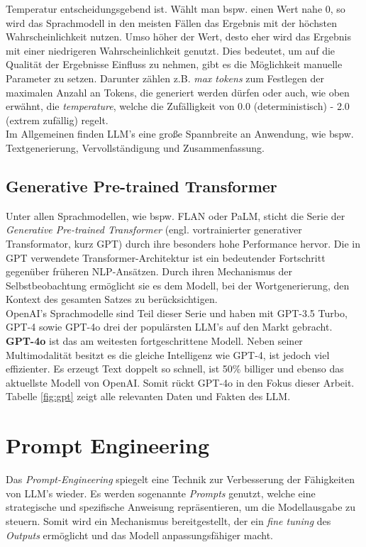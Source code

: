 Temperatur entscheidungsgebend ist. Wählt man bspw. einen Wert nahe 0, so wird das Sprachmodell in den meisten Fällen das Ergebnis mit der höchsten Wahrscheinlichkeit nutzen. Umso höher der Wert, desto eher wird das Ergebnis mit einer niedrigeren Wahrscheinlichkeit genutzt. \cite*{WeightsBiases} Dies bedeutet, um auf die Qualität der Ergebnisse Einfluss zu nehmen, gibt es die Möglichkeit manuelle Parameter zu setzen. Darunter zählen z.B. \textit{max tokens} zum Festlegen der maximalen Anzahl an Tokens, die generiert werden dürfen oder auch, wie oben erwähnt, die \textit{temperature}, welche die Zufälligkeit von 0.0 (deterministisch) - 2.0 (extrem zufällig) regelt.\\ Im Allgemeinen finden LLM's eine große Spannbreite an Anwendung, wie bspw. Textgenerierung, Vervollständigung und Zusammenfassung. \cite*{dhadukHowLargeLanguage2023}

\subsection{Generative Pre-trained Transformer}
Unter allen Sprachmodellen, wie bspw. FLAN oder PaLM, sticht die Serie der \textit{Generative Pre-trained Transformer} (engl. vortrainierter generativer Transformator, kurz GPT) durch ihre besonders hohe Performance hervor. \cite*{yeComprehensiveCapabilityAnalysis2023} Die in GPT verwendete Transformer-Architektur ist ein bedeutender Fortschritt gegenüber früheren \acs{NLP}-Ansätzen. Durch ihren Mechanismus der Selbstbeobachtung ermöglicht sie es dem Modell, bei der Wortgenerierung, den Kontext des gesamten Satzes zu berücksichtigen. \cite*{yenduriGenerativePretrainedTransformer2023} \\ OpenAI's Sprachmodelle sind Teil dieser Serie und haben mit GPT-3.5 Turbo, GPT-4 sowie GPT-4o drei der populärsten LLM's auf den Markt gebracht. \cite*{yaoSurveyLargeLanguage2024}\\
\textbf{GPT-4o} ist das am weitesten fortgeschrittene Modell. Neben seiner Multimodalität besitzt es die gleiche Intelligenz wie GPT-4, ist jedoch viel effizienter. Es erzeugt Text doppelt so schnell, ist 50\% billiger und ebenso das aktuellste Modell von OpenAI. Somit rückt GPT-4o in den Fokus dieser Arbeit. \cite*{OpenAIPlatform} Tabelle \ref{fig:gpt} zeigt alle relevanten Daten und Fakten des LLM.



\section{Prompt Engineering}
Das \textit{Prompt-Engineering} spiegelt eine Technik zur Verbesserung der Fähigkeiten von LLM's wieder. Es werden sogenannte \textit{Prompts} genutzt, welche eine strategische und spezifische Anweisung repräsentieren, um die Modellausgabe zu steuern. Somit wird ein Mechanismus bereitgestellt, der ein \textit{fine tuning} des \textit{Outputs} ermöglicht und das Modell anpassungsfähiger macht. \cite*{sahooSystematicSurveyPrompt2024} 

